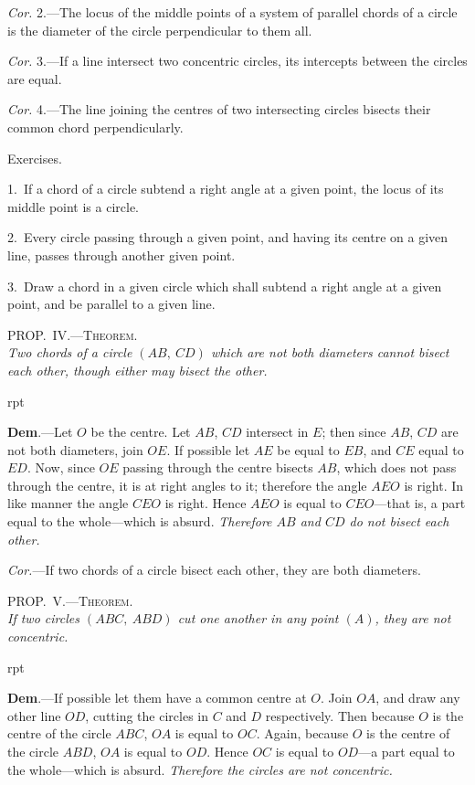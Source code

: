 \documentclass[oneside]{book}
\newcounter{wrapwidth}
\newcommand\myprop[2]{
\bigskip\Needspace*{4\baselineskip}\begin{center}\textsc{#1}\\\medskip\emph{#2}\par\end{center}
}
\newcommand\exhead[1]{
\Needspace*{5\baselineskip}\begin{center}
\textsf{#1}
\end{center}
}
\newcommand\imgflow[3]{
\setcounter{wrapwidth}{#1}

\begin{wrapfigure}[#2]{r}{\value{wrapwidth}pt}
\begin{center}
\vspace{-0.3in}

\end{center}
\end{wrapfigure}
}
\begin{document}
\textit{Cor.} 2.---The locus of the middle points of a system
of parallel chords of a circle is the diameter of the
circle perpendicular to them all.

\textit{Cor.} 3.---If a line intersect two concentric circles,
its intercepts between the circles are equal.

\textit{Cor.} 4.---The line joining the centres of two intersecting
circles bisects their common chord perpendicularly.


\exhead{Exercises.}

\begin{footnotesize}
1.~If a chord of a circle subtend a right angle at a given
point, the locus of its middle point is a circle.

2.~Every circle passing through a given point, and having its
centre on a given line, passes through another given point.

3.~Draw a chord in a given circle which shall subtend a right
angle at a given point, and be parallel to a given line.
\par\end{footnotesize}


\myprop{PROP\@.~IV\@.---Theorem.}{Two chords of a circle $(AB,\ CD)$ which are not both
diameters cannot bisect each other, though either may
bisect the other.}


\imgflow{115}{9}{f107}

\textbf{Dem}.---Let $O$ be the centre. Let $AB$, $CD$ intersect
in $E$; then since $AB$, $CD$ are not
both diameters, join $OE$. If possible
let $AE$ be equal to $EB$, and
$CE$ equal to $ED$. Now, since $OE$
passing through the centre bisects
$AB$, which does not pass through
the centre, it is at right angles to
it; therefore the angle $AEO$ is
right. In like manner the angle
$CEO$ is right. Hence $AEO$ is equal to $CEO$---that is,
a part equal to the whole---which is absurd. \textit{Therefore
$AB$ and $CD$ do not bisect each other.}

\textit{Cor.}---If two chords of a circle bisect each other,
they are both diameters.



\myprop{PROP\@.~V.---Theorem.}{If two circles $(ABC,\ ABD)$ cut one another in any point
$(A)$, they are not concentric.}


\imgflow{118}{8}{f108}

\textbf{Dem}.---If possible let them have a common centre at
$O$. Join $OA$, and draw any other
line $OD$, cutting the circles in $C$
and $D$ respectively. Then because
$O$ is the centre of the circle $ABC$,
$OA$ is equal to $OC$. Again, because
$O$ is the centre of the circle
$ABD$, $OA$ is equal to $OD$. Hence
$OC$ is equal to $OD$---a part equal
to the whole---which is absurd.
\emph{Therefore the circles
are not concentric.}
\end{document}
